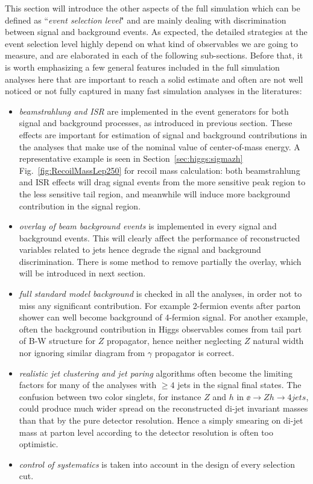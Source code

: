 This section will introduce the other aspects of the full simulation which can be
defined as ``{\it event selection level}" and are mainly dealing with discrimination 
between signal and background events. As expected, the detailed strategies 
at the event selection level highly depend on what kind of observables we are going to
measure, and are elaborated in each of the following sub-sections. Before that, it is worth
emphasizing a few general features included in the full simulation analyses here
that are important to reach a solid estimate
and often are not well noticed or not fully captured in 
many fast simulation analyses in the literatures:
\begin{itemize}
\item {\it beamstrahlung and ISR}
are implemented in the event generators for both signal and background processes,
as introduced in previous section. These effects are important for estimation of 
signal and background contributions in the analyses that make use of the 
nominal value of center-of-mass energy. A representative example is seen in
Section~\ref{sec:higgs:sigmazh} Fig.~\ref{fig:RecoilMassLep250} for recoil
mass calculation: both beamstrahlung and ISR effects will drag signal events
from the more sensitive peak region to the less sensitive tail region, and meanwhile
will induce more background contribution in the signal region.
\item {\it overlay of beam background events} is implemented in every signal 
and background events. This will clearly affect the performance of 
reconstructed variables related to jets hence degrade the signal and background
discrimination. There is some method to remove partially the overlay, which will 
be introduced in next section. 
\item {\it full standard model background} is checked in all the analyses, 
in order not to miss any significant contribution. For example 2-fermion 
events after parton shower can well become background of 4-fermion signal.
For another example, often the background contribution in Higgs observables
comes from tail part of B-W structure for $Z$ propagator, hence neither neglecting 
$Z$ natural width nor ignoring similar diagram from $\gamma$ propagator is correct.
\item {\it realistic jet clustering and jet paring} algorithms often become the 
limiting factors for many of the analyses with $\ge 4$ jets in the signal final states.
The confusion between two color singlets, for instance $Z$ and $h$ in $\ee\to Zh\to 4 jets$,
could produce much wider spread on the reconstructed di-jet invariant masses 
than that by the pure detector resolution. Hence a simply smearing on di-jet mass
at parton level according to the detector resolution is often too optimistic. 
\item {\it control of systematics} is taken into account in the design of every
selection cut.
\end{itemize}

